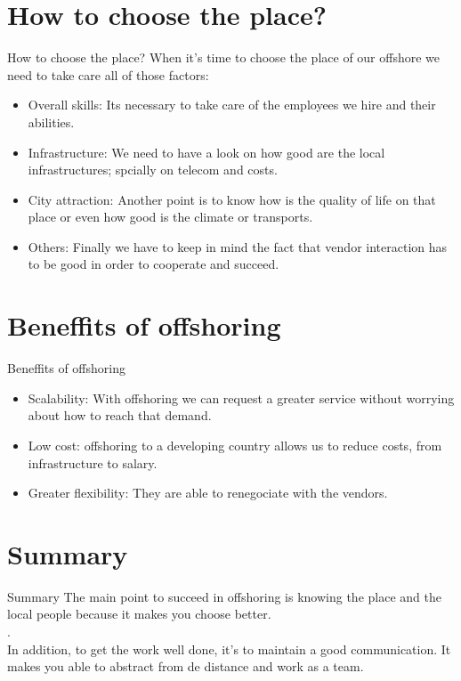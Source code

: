 \documentclass{beamer}
\begin{document}
\section{How to choose the place?}
\begin{frame}{How to choose the place?}
	When it's time to choose the place of our offshore we need to take care all of those factors:
	\begin{itemize}
		
		\item Overall skills: Its necessary to take care of the employees we hire and their abilities.
		\item Infrastructure: We need to have a look on how good are the local infrastructures; spcially on telecom and costs.
		\item City attraction: Another point is to know how is the quality of life on that place or even how good is the climate or transports.
		\item Others: Finally we have to keep in mind the fact that vendor interaction has to be good in order to cooperate and succeed.
	\end{itemize}
\end{frame}

\section{Beneffits of offshoring}
\begin{frame}{Beneffits of offshoring}
	\begin{itemize}
		\item Scalability: With offshoring we can request a greater service without worrying about how to reach that demand.

		\item Low cost: offshoring to a developing country allows us to reduce costs, from infrastructure to salary.
		
		\item Greater flexibility: They are able to renegociate with the vendors.
	\end{itemize}
\end{frame}

\section{Summary}
\begin{frame}{Summary}
	The main point to succeed in offshoring is knowing the place and the local people because it makes you choose better.\\
	\color{white}.\\
	\color{black}
	In addition, to get the work well done, it's to maintain a good communication. It makes you able to abstract from de distance and work as a team.
\end{frame}
\end{document}

